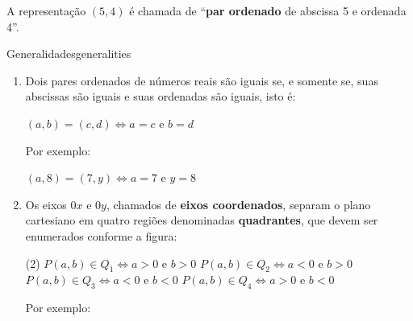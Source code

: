 A representação $(5,4)$ é chamada de ``\textbf{par ordenado} de abscissa 5 e ordenada 4''.

\begin{proposition}{Generalidades}{generalities}
  \begin{enumerate}
    \item Dois pares ordenados de números reais são iguais se, e somente se, suas abscissas são iguais e 
      suas ordenadas são iguais, isto é:

      \vspace{.2cm}
      $(a, b) = (c, d) \iff  a = c \text{ e } b = d$

      \vspace{.2cm}
      Por exemplo:

      \vspace{.2cm}
      $(a, 8) = (7, y) \iff a = 7 \text{ e } y = 8$

    \vspace{.2cm}
    \item Os eixos $0x$ e $0y$, chamados de \textbf{eixos coordenados}, separam o plano cartesiano em quatro 
      regiões denominadas \textbf{quadrantes}, que devem ser enumerados conforme a figura:

    \vspace{.2cm}
    \begin{center}
    \end{center}

    \vspace{.2cm}
    \begin{tasks}(2)
      \task[] $P(a,b) \in Q_1 \iff a > 0 \text{ e } b > 0$
      \task[] $P(a,b) \in Q_2 \iff a < 0 \text{ e } b > 0$
      \task[] $P(a,b) \in Q_3 \iff a < 0 \text{ e } b < 0$
      \task[] $P(a,b) \in Q_4 \iff a > 0 \text{ e } b < 0$
    \end{tasks}

    \vspace{.2cm}
    Por exemplo:


\end{enumerate}
\end{proposition}
